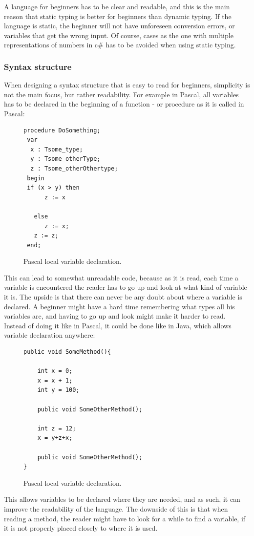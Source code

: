 A language for beginners has to be clear and readable, and this is the main reason that static typing is better for beginners than dynamic typing. If the language is static, the beginner will not have unforeseen conversion errors, or variables that get the wrong input. Of course, cases as the one with multiple representations of numbers in c\# has to be avoided when using static typing. 


\subsubsection{Syntax structure}
When designing a syntax structure that is easy to read for beginners, simplicity is not the main focus, but rather readability. For example in Pascal, all variables has to be declared in the beginning of a function - or procedure as it is called in Pascal:

\lstset{language=[Sharp]C}  
\begin{figure}[H]
\centering
\begin{lstlisting}
procedure DoSomething; 
 var 
  x : Tsome_type;
  y : Tsome_otherType;
  z : Tsome_otherOthertype;
 begin
 if (x > y) then
      z := x
   
   else
      z := x;
   z := z;
 end;
\end{lstlisting}
\caption{Pascal local variable declaration.}\cite{pascalvar}
\label{fig:pascalvar}
\end{figure}
This can lead to somewhat unreadable code, because as it is read, each time a variable is encountered the reader has to go up and look at what kind of variable it is. The upside is that there can never be any doubt about where a variable is declared. A beginner might have a hard time remembering what types all his variables are, and having to go up and look might make it harder to read. 
\\Instead of doing it like in Pascal, it could be done like in Java, which allows variable declaration anywhere:
\lstset{language=[Sharp]C}  
\begin{figure}[H]
\centering
\begin{lstlisting}
public void SomeMethod(){

    int x = 0;
    x = x + 1;
    int y = 100;
    
    public void SomeOtherMethod();
    
    int z = 12;
    x = y+z+x;
    
    public void SomeOtherMethod();
}
\end{lstlisting}
\caption{Pascal local variable declaration.}
\label{fig:javavar}
\end{figure}
This allows variables to be declared where they are needed, and as such, it can improve the readability of the language. The downside of this is that when reading a method, the reader might have to look for a while to find a variable, if it is not properly placed closely to where it is used. 

